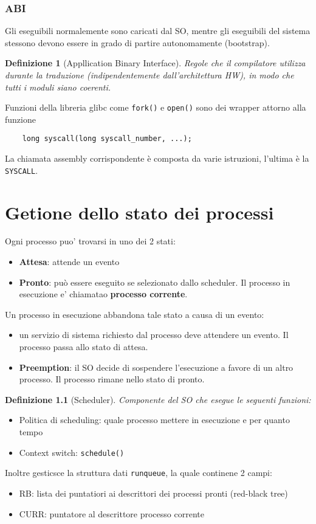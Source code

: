 \documentclass[12pt, a4paper]{report}
\newtheorem{definition}{Definizione}
\begin{document}
\subsection{ABI}
Gli eseguibili normalemente sono caricati dal SO, mentre gli eseguibili del
sistema stessono devono essere in grado di partire autonomamente (bootstrap).
\begin{definition}[Appllication Binary Interface]
	Regole che il compilatore utilizza durante la traduzione (indipendentemente
	dall'architettura HW), in modo che tutti i moduli siano coerenti.
\end{definition}
Funzioni della libreria glibc come \texttt{fork()} e \texttt{open()} sono dei
wrapper attorno alla funzione
\begin{verbatim}
	long syscall(long syscall_number, ...);
\end{verbatim}
La chiamata assembly corrispondente è composta da varie istruzioni, l'ultima è
la \texttt{SYSCALL}.

\chapter{Getione dello stato dei processi}
Ogni processo puo' trovarsi in uno dei 2 stati:
\begin{itemize}
	\item \textbf{Attesa}: attende un evento
	\item \textbf{Pronto}: può essere eseguito se selezionato dallo scheduler.
	      Il processo in esecuzione e' chiamatao \textbf{processo corrente}.
\end{itemize}
Un processo in esecuzione abbandona tale stato a causa di un evento:
\begin{itemize}
	\item un servizio di sistema richiesto dal processo deve attendere un
	      evento. Il processo passa allo stato di attesa.
	\item \textbf{Preemption}: il SO decide di sospendere l'esecuzione a favore
	      di un altro processo. Il processo rimane nello stato di pronto.
\end{itemize}
\begin{definition}[Scheduler]
	Componente del SO che esegue le seguenti funzioni:
\end{definition}
\begin{itemize}
	\item Politica di scheduling: quale processo mettere in esecuzione e per
	      quanto tempo
	\item Context switch: \texttt{schedule()}
\end{itemize}
Inoltre gesticsce la struttura dati \texttt{runqueue}, la quale continene 2
campi:
\begin{itemize}
	\item RB: lista dei puntatiori ai descrittori dei processi pronti (red-black
	      tree)
	\item CURR: puntatore al descrittore processo corrente
\end{itemize}
\end{document}
